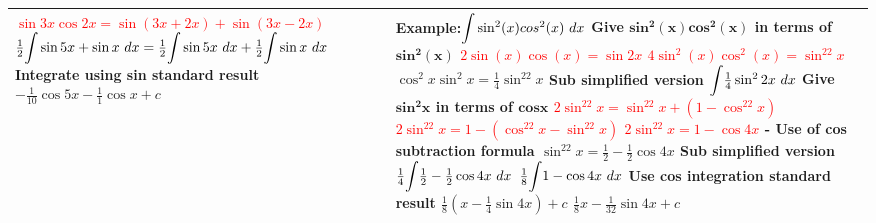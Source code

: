 \documentclass{article}
\begin{document}
\begin{tabularx}{\textwidth}{|X|X|X|}
\textcolor{red}{$\sin 3x\cos 2x=\sin(3x+2x)+\sin(3x-2x)$}\newline
$\frac{1}{2}\mathlarger{\int}\sin5x+\sin x \ dx=\frac{1}{2}\mathlarger{\int}\sin5x \ dx+\frac{1}{2}\mathlarger{\int}\sin x \ dx$\newline
\newline
\textbf{Integrate using sin standard result}\newline
$-\frac{1}{10}\cos5x-\frac{1}{1}\cos x+c$
&
\textbf{Example:}$\mathlarger{\int}\sin^2(x)cos^2(x) \ dx$\newline
\textbf{Give $\mathbf{sin^2(x)cos^2(x)}$ in terms of $\mathbf{sin^2(x)}$}\newline
\textcolor{red}{$2\sin(x)\cos(x)=\sin2x$}\newline
\textcolor{red}{$4\sin^2(x)\cos^2(x)=\sin^22x$}\newline
$\cos^2x\sin^2x=\frac{1}{4}\sin^22x$\newline
\textbf{Sub simplified version}\newline
$\mathlarger{\int}\frac{1}{4}\sin^22x \ dx$\newline
\textbf{Give $\mathbf{sin^2x}$ in terms of $\mathbf{cosx}$}\newline
\textcolor{red}{$2\sin^22x=\sin^22x+(1-\cos^22x)$}\newline
\textcolor{red}{$2\sin^22x=1-(\cos^22x-\sin^22x)$}\newline
\textcolor{red}{$2\sin^22x=1-\cos4x$} - Use of cos subtraction formula\newline
$\sin^22x=\frac{1}{2}-\frac{1}{2}\cos4x$\newline
\textbf{Sub simplified version}\newline
$\frac{1}{4}\mathlarger{\int}\frac{1}{2}-\frac{1}{2}\cos4x \ dx$\newline
$\frac{1}{8}\mathlarger{\int}1-\cos4x \ dx$\newline
\textbf{Use cos integration standard result}\newline
$\frac{1}{8}(x-\frac{1}{4}\sin4x)+c$\newline
\newline
$\frac{1}{8}x-\frac{1}{32}\sin4x+c$\newline
\\
\hline
\end{tabularx}
\newpage
\end{document}
